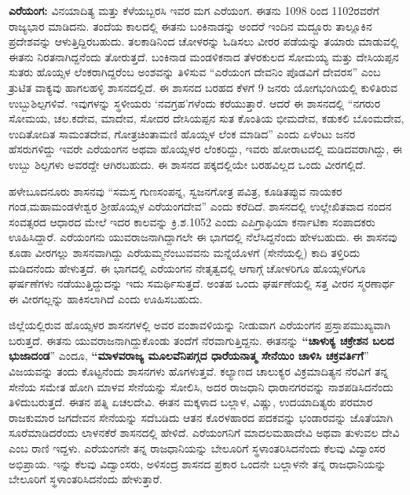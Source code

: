 \textbf{ಎರೆಯಂಗ:} ವಿನಯಾದಿತ್ಯ ಮತ್ತು ಕೆಳೆಯಬ್ಬರಸಿ ಇವರ ಮಗ ಎರೆಯಂಗ. ಈತನು 1098 ರಿಂದ 1102ರವರೆಗೆ ರಾಜ್ಯಭಾರ ಮಾಡಿದನು. ತಂದೆಯ ಕಾಲದಲ್ಲಿ ಈತನು ಬಂಕಿನಾಡನ್ನು ಅಂದರೆ ಇಂದಿನ ಮದ್ದೂರು ತಾಲ್ಲೂಕಿನ ಪ್ರದೇಶವನ್ನು ಆಳುತ್ತಿದ್ದಿರಬಹುದು. ತಲಕಾಡಿನಿಂದ ಚೋಳರನ್ನು ಓಡಿಸಲು ವೀರರ ಪಡೆಯನ್ನು ತಯಾರು ಮಾಡುವಲ್ಲಿ ಈತನು ನಿರತನಾಗಿದ್ದನೆಂದು ತೋರುತ್ತದೆ. ಬಂಕಿನಾಡ ಮಂಡಳಿಕನಾದ ತೆಳರಕುಲದ ಸೋಮಯ್ಯ ಮತ್ತು ದೇಸಿಯಪ್ಪನ ಸುತರು ಹೊಯ್ಸಳ ಲೆಂಕರಾಗಿದ್ದರೆಂಬ ಅಂಶವನ್ನು ತಿಳಿಸುವ “ಎರೆಯಂಗ ದೇವನಿಂ ಪೊಡವಿಗೆ ದೇವರಸ” ಎಂಬ ತ್ರುಟಿತ ವಾಕ್ಯವು ಹಾಗಲಹಳ್ಳಿ ಶಾಸನದಲ್ಲಿದೆ. ಈ ಶಾಸನದ ಬರಹದ ಕೆಳಗೆ 9 ಜನರು ಯೋಗಭಂಗಿಯಲ್ಲಿ ಕುಳಿತಿರುವ ಉಬ್ಬುಶಿಲ್ಪಗಳಿವೆ. ಇವುಗಳನ್ನು ಸ್ಥಳೀಯರು ‘ನವಗ್ರಹ’ಗಳೆಂದು ಕರೆಯುತ್ತಾರೆ. ಆದರೆ ಈ ಶಾಸನದಲ್ಲಿ “ನಗರುರ ಸೋಮಯ, ಚಲ.ಕದೇವ, ಮಾದೇವ, ಸೋದರ ದೇಸಿಯಪ್ಪನ ಸುತ ಕೊಂತಿಯ ಭೀಮದೇವ, ಕಡುಕಲಿ ಬೊಂಮದೇವ, ಉದಿತೋದಿತ ಸಾಮಂತದೇವ, ಗೋತ್ರಚಿಂತಾಮಣಿ ಹೊಯ್ಸಳ ಲೆಂಕ ಮಾಡಿದ” ಎಂದು ಏಳೆಂಟು ಜನರ ಹೆಸರುಗಳಿದ್ದು ಇವರೇ ಎರೆಯಂಗನ ಅಥವಾ ಹೊಯ್ಸಳರ ಲೆಂಕರಿದ್ದು, ಇವರು ಹೋರಾಟದಲ್ಲಿ ಮಡಿದವರಾಗಿದ್ದು, ಈ ಉಬ್ಬು ಶಿಲ್ಪಗಳು ಅವರದ್ದೇ ಆಗಿರಬಹುದು. ಈ ಶಾಸನದ ಪಕ್ಕದಲ್ಲಿಯೇ ಬರಹವಿಲ್ಲದ ಒಂದು ವೀರಗಲ್ಲಿದೆ.

ಹಳೇಬೂದನೂರು ಶಾಸನವು “ಸಮಸ್ತ ಗುಣಸಂಪನ್ನ, ಸ್ವಜನಗೋತ್ರ ಪವಿತ್ರ, ಕೂಡಿತಪ್ಪುವ ನಾಯಕರ ಗಂಡ,\break ಮಹಾಮಂಡಳೇಶ್ವರ ಶ‍್ರೀಹೊಯ್ಸಳ ಎರೆಯಂಗದೇವ” ಎಂದು ಕರೆದಿದೆ. ಶಾಸನದಲ್ಲಿ ಉಲ್ಲೇಖಿತವಾದ ನಂದನ ಸಂವತ್ಸರದ ಆಧಾರದ ಮೇಲೆ ಇದರ ಕಾಲವನ್ನು ಕ್ರಿ.ಶ.1052 ಎಂದು ಎಪಿಗ್ರಾಫಿಯಾ ಕರ್ನಾಟಿಕಾ ಸಂಪಾದಕರು ಊಹಿಸಿದ್ದಾರೆ. ಎರೆಯಂಗನು ಯುವರಾಜನಾಗಿದ್ದಾಗಲೇ ಈ ಭಾಗದಲ್ಲಿ ನೆಲೆಸಿದ್ದನೆಂದು ಹೇಳಬಹುದು. ಈ ಶಾಸನವು ಕೂಡಾ ವೀರಗಲ್ಲು ಶಾಸನವಾಗಿದ್ದು ಎರೆಯಮ್ಮನೆಂಬುವವನು ಮನ್ನೆಯೊಳಗೆ (ಸೇನೆಯಲ್ಲಿ) ಕಾದಿ ತಳ್ತಿರಿದು ಮಡಿದನೆಂದು ಹೇಳುತ್ತದೆ. ಈ ಭಾಗದಲ್ಲಿ ಎರೆಯಂಗನ ನೇತೃತ್ವದಲ್ಲಿ ಆಗಾಗ್ಗೆ ಚೋಳರಿಗೂ ಹೊಯ್ಸಳರಿಗೂ ಘರ್ಷಣೆಗಳು ನಡೆಯುತ್ತಿದ್ದುದನ್ನು ಇದು ಸಮರ್ಥಿಸುತ್ತದೆ. ಅಂತಹ ಒಂದು ಘರ್ಷಣೆಯಲ್ಲಿ ಸತ್ತ ವೀರನ ಸ್ಮರಣಾರ್ಥ ಈ ವೀರಗಲ್ಲನ್ನು ಹಾಕಿಸಲಾಗಿದೆ ಎಂದು ಊಹಿಸಬಹುದು.

ಜಿಲ್ಲೆಯಲ್ಲಿರುವ ಹೊಯ್ಸಳರ ಶಾಸನಗಳಲ್ಲಿ ಅವರ ವಂಶಾವಳಿಯನ್ನು ನೀಡುವಾಗ ಎರೆಯಂಗನ ಪ್ರಸ್ತಾಪ\break ಮುಖ್ಯವಾಗಿ ಬರುತ್ತದೆ. ಈತನು ಯುವರಾಜನಾಗಿದ್ದುಕೊಂಡು ತಂದೆಗೆ ನೆರವಾಗುತ್ತಿದ್ದನು. ಈತನನ್ನು \textbf{“ಚಾಳುಕ್ಯ ಚಕ್ರೇಶನ ಬಲದ ಭುಜಾದಂಡ}” ಎಂದೂ,\textbf{ “ಮಾಳವರಾಜ್ಯ ಮೂಲವೆನಿಪಗ್ಗದ ಧಾರೆಯನಾತ್ಮ ಸೇನೆಯಿಂ ಚಾಳಿಸಿ ಚಕ್ರವರ್ತಿಗೆ}” ವಿಜಯವನ್ನು ತಂದು ಕೊಟ್ಟನೆಂದು ಶಾಸನಗಳು ಹೊಗಳುತ್ತವೆ. ಕಲ್ಯಾಣದ ಚಾಲುಕ್ಯರ ವಿಕ್ರಮಾದಿತ್ಯನ ನೆರವಿಗೆ ತನ್ನ ಸೇನೆಯ ಸಮೇತ ಹೋಗಿ ಮಾಳವ ಸೇನೆಯನ್ನು ಸೋಲಿಸಿ, ಅದರ ರಾಜಧಾನಿ ಧಾರಾನಗರವನ್ನು ನಾಶಪಡಿಸಿದನೆಂದು ತಿಳಿದುಬರುತ್ತದೆ. ಈತನ ಪತ್ನಿ ಏಚಲದೇವಿ. ಈತನ ಮಕ್ಕಳಾದ ಬಲ್ಲಾಳ, ವಿಷ್ಣು, ಉದಯಾದಿತ್ಯರು ಪರಮಾರ ರಾಜಕುಮಾರ ಜಗದೇವನ ಸೇನೆಯನ್ನು ಸದೆಬಡಿದು ಆತನ ಕೊರಳಹಾರದ ಪದಕವನ್ನು ಭಂಡಾರವನ್ನು ಜೊತೆಯಾಗಿ ಸೂರೆಮಾಡಿದರೆಂದು ಲಾಳನಕೆರೆ ಶಾಸನದಲ್ಲಿ ಹೇಳಿದೆ. ಎರೆಯಂಗನಿಗೆ ಮಾದಲಮಹಾದೇವಿ ಅಥವಾ ತುಳುವಲ ದೇವಿ ಎಂಬ ರಾಣಿ ಇದ್ದಳು. ಎರೆಯಂಗನೇ ತನ್ನ ರಾಜಧಾನಿಯನ್ನು ಬೇಲೂರಿಗೆ ಸ್ಥಳಾಂತರಿಸಿದನೆಂದು ಕೆಲವು ವಿದ್ವಾಂಸರ ಅಭಿಪ್ರಾಯ. ಇನ್ನು ಕೆಲವು ವಿದ್ವಾಂಸರು, ಅಳಿಸಂದ್ರ ಶಾಸನದ ಪ್ರಕಾರ ಒಂದನೇ ಬಲ್ಲಾಳನೇ ತನ್ನ ರಾಜಧಾನಿಯನ್ನು ಬೇಲೂರಿಗೆ ಸ್ಥಳಾಂತರಿಸಿದನೆಂದು ಹೇಳುತ್ತಾರೆ.

